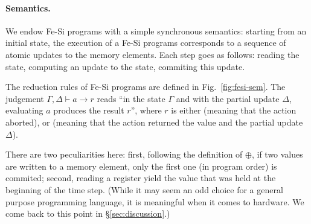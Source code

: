 \documentclass[preprint]{sigplanconf}
\begin{document}
\paragraph{Semantics.}
We endow Fe-Si programs with a simple synchronous semantics:  starting
from an initial state, the execution of a Fe-Si programs corresponds
to a sequence of atomic updates to the memory elements. 
%
Each step goes as follows: reading the state, computing an update to
the state, commiting this update.
%

\begin{figure*}
  \centering
\caption{Dynamic semantics of Fe-Si programs}\label{fig:fesi-sem}
\end{figure*}

The reduction rules of Fe-Si programs are defined in
Fig.~\ref{fig:fesi-sem}. The judgement $\Gamma, \Delta \vdash a \to r$
reads ``in the state $\Gamma$ and with the partial update $\Delta$,
evaluating $a$ produces the result $r$'', where $r$ is either
 (meaning that the action aborted), or %
 (meaning that the action returned the value
 and the partial update $\Delta$). 

There are two peculiarities here: first, following the definition of
$\oplus$, if two values are written to a memory element, only the
first one (in program order) is commited; second, reading a register
yield the value that was held at the beginning of the time step. 
%
(While it may seem an odd choice for a general purpose programming
language, it is meaningful when it comes to hardware. We come back to
this point in \S\ref{sec:discussion}.)
\end{document}
